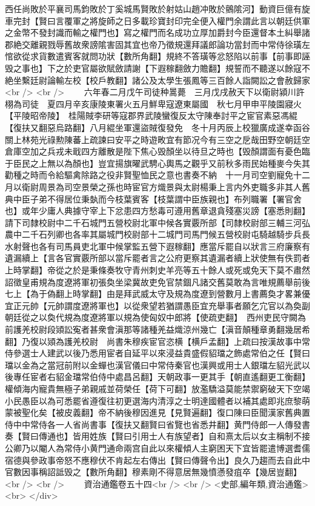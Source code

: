 西任尚敗於平襄司馬鈞敗於丁奚城馬賢敗於射姑山趙冲敗於鸇隂河】動資巨億有旋車完封【賢曰言覆軍之將旋師之日多載珍寶封印完全便入權門余謂此言以朝廷供軍之金幣不發封識而輸之權門也】寫之權門而名成功立厚加爵封今臣還督本土糾舉諸郡絶交離親戮辱舊故衆謗隂害固其宜也帝乃徵規還拜議郎論功當封而中常侍徐璜左悺欲從求貨數遣賓客就問功狀【數所角翻】規終不答璜等忿怒陷以前事【前事即誣毁之事也】下之於吏官屬欲賦斂請謝【下遐稼翻斂力贍翻】規誓而不聽遂以餘寇不絶坐繫廷尉論輸左校【校戶教翻】諸公及太學生張鳳等三百餘人詣闕訟之會赦歸家<br />
<br />
　　六年春二月戊午司徒种暠薨　三月戊戌赦天下以衛尉潁川許栩為司徒　夏四月辛亥康陵東署火五月鮮卑寇遼東屬國　秋七月甲申平陵園寢火【平陵昭帝陵】　桂陽賊李研等寇郡界武陵蠻復反太守陳奉討平之宦官素惡馮緄【復扶又翻惡烏路翻】八月緄坐軍還盜賊復發免　冬十月丙辰上校獵廣成遂幸函谷關上林苑光祿勲陳蕃上疏諫曰安平之時遊畋宜有節况今有三空之戹哉田野空朝廷空倉庫空加之兵戎未戢四方離散是陛下焦心毁顏坐以待旦之時也【毁顏謂面有憂色臨于臣民之上無以為顏也】豈宜揚旗曜武騁心輿馬之觀乎又前秋多雨民始種麥今失其勸種之時而令給驅禽除路之役非賢聖恤民之意也書奏不納　十一月司空劉寵免十二月以衛尉周景為司空景榮之孫也時宦官方熾景與太尉楊秉上言内外吏職多非其人舊典中臣子弟不得居位秉埶而今枝葉賓客【枝葉謂中臣族親也】布列職署【署官舍也】或年少庸人典據守宰上下忿患四方愁毒可遵用舊章退貪殘塞災謗【塞悉則翻】請下司隸校尉中二千石城門五營校尉北軍中候各實覈所部【司隸校尉部三輔三河弘農中二千石列卿也各率其屬城門校尉部十二城門司馬門候五營校尉屯騎越騎步兵長水射聲也各有司馬員吏北軍中候掌監五營下遐稼翻】應當斥罷自以狀言三府廉察有遺漏續上【言各官實覈所部以當斥罷者言之公府更察其遺漏者續上狀使無有佚罰者上時掌翻】帝從之於是秉條奏牧守青州刺史羊亮等五十餘人或死或免天下莫不肅然　詔徵皇甫規為度遼將軍初張奐坐梁冀故吏免官禁錮凡諸交舊莫敢為言唯規薦舉前後七上【為于偽翻上時掌翻】由是拜武威太守及規為度遼到營數月上書薦奐才畧兼優宜正元帥【元帥謂度遼將軍也】以從衆望若猶謂愚臣宜充舉事者願乞宂官以為奐副朝廷從之以奐代規為度遼將軍以規為使匈奴中郎將【使疏吏翻】　西州吏民守闕為前護羌校尉段熲訟寃者甚衆會滇那等諸種羌益熾涼州幾亡【滇音顛種章勇翻幾居希翻】乃復以熲為護羌校尉　尚書朱穆疾宦官恣横【横戶孟翻】上疏曰按漢故事中常侍參選士人建武以後乃悉用宦者自延平以來浸益貴盛假貂璫之飾處常伯之任【賢曰璫以金為之當冠前附以金蟬也漢官儀曰中常侍秦官也漢興或用士人銀璫左貂光武以後專任宦者右貂金璫常伯侍中處昌呂翻】天朝政事一更其手【朝直遙翻更工衡翻】權傾海内寵貴無極子弟親戚並荷榮任【荷下可翻】放濫驕溢莫能禁禦窮破天下空竭小民愚臣以為可悉罷省遵復往初更選海内清淳之士明達國體者以補其處即兆庶黎萌蒙被聖化矣【被皮義翻】帝不納後穆因進見【見賢遍翻】復口陳曰臣聞漢家舊典置侍中中常侍各一人省尚書事【復扶又翻賢曰省覽也省悉井翻】黄門侍郎一人傳發書奏【賢曰傳通也】皆用姓族【賢曰引用士人有族望者】自和熹太后以女主稱制不接公卿乃以閹人為常侍小黄門通命兩宫自此以來權傾人主窮困天下宜皆罷遣博選耆儒宿德與參政事帝怒不應穆伏不肯起左右傳出【賢曰傳聲令出】良久乃趨而去自此中官數因事稱詔詆毁之【數所角翻】穆素剛不得意居無幾憤懣發疽卒【幾居豈翻】<br />
<br />
　　資治通鑑卷五十四<br />
<br />
<史部,編年類,資治通鑑>  <br>
   </div> 

